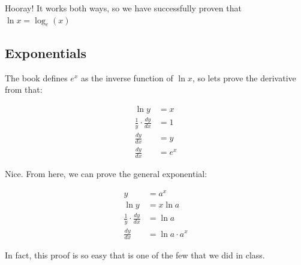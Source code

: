 Hooray! It works both ways, so we have successfully proven that $\boxed{\ln x = \log_e(x)}$

\subsection{Exponentials}

The book defines $e^x$ as the inverse function of $\ln x$, so lets prove the derivative from that:

\begin{align}
\ln y &= x \\ 
\frac{1}{y} \cdot \frac{dy}{dx} &= 1 \\
\frac{dy}{dx} &= y \\
\frac{dy}{dx} &= e^x 
\end{align}

Nice. From here, we can prove the general exponential:

\begin{align}
y &= a^x \\
\ln y &= x \ln a \\
\frac{1}{y} \cdot \frac{dy}{dx} &= \ln a \\
\frac{dy}{dx} &= \ln a \cdot a^x 
\end{align}

In fact, this proof is so easy that is one of the few that we did in class.
